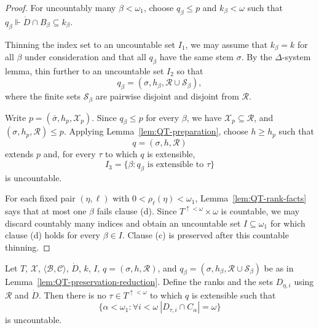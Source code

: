 \begin{proof}
For uncountably many $\beta<\omega_1$, choose $q_\beta\leq p$ and
$k_\beta<\omega$ such that $q_\beta\Vdash \dot D\cap B_\beta\subseteq k_\beta$.

Thinning the index set to an uncountable set $I_1$, we may assume that $k_\beta=k$ for all $\beta$ under
consideration and that all $q_\beta$ have the same stem $\sigma$.  By the
$\Delta$-system lemma, thin further to an uncountable set $I_2$ so that
\[
  q_\beta=(\sigma,h_\beta,\mathcal R\cup\mathcal S_\beta),
\]
where the finite sets $\mathcal S_\beta$ are pairwise disjoint and disjoint
from $\mathcal R$.

Write $p=(\bar\sigma,h_p,\mathcal X_p)$.  Since $q_\beta\leq p$ for every
$\beta$, we have $\mathcal X_p\subseteq\mathcal R$, and
$(\sigma,h_p,\mathcal R)\leq p$.  Applying
Lemma~\ref{lem:QT-preparation}, choose $h\geq h_p$ such that
\[
  q=(\sigma,h,\mathcal R)
\]
extends $p$ and, for every $\tau$ to which $q$ is extensible,
\[
  I_3=\{\beta:q_\beta\text{ is extensible to }\tau\}
\]
is uncountable.

For each fixed pair $(\eta,\ell)$ with $0<\rho_\ell(\eta)<\omega_1$,
Lemma~\ref{lem:QT-rank-facts} says that at most one $\beta$ fails clause (d).
Since $T^{\uparrow<\omega}\times\omega$ is countable, we may discard countably
many indices and obtain an uncountable set $I\subseteq\omega_1$ for which
clause (d) holds for every $\beta\in I$.  Clause (c) is preserved after this
countable thinning.
\end{proof}

\begin{lemma}\label{lem:QT-case-one-impossible}
Let $T$, $\mathcal X$, $\langle\mathcal B,\mathcal C\rangle$, $\dot D$,
$k$, $I$, $q=(\sigma,h,\mathcal R)$, and
$q_\beta=(\sigma,h_\beta,\mathcal R\cup\mathcal S_\beta)$ be as in
Lemma~\ref{lem:QT-preservation-reduction}.  Define the ranks and the sets
$D_{\eta,i}$ using $\mathcal R$ and $\dot D$.  Then there is no
$\tau\in T^{\uparrow<\omega}$ to which $q$ is extensible such that
\[
  \{\alpha<\omega_1:
    \forall i<\omega\ |D_{\tau,i}\cap C_\alpha|=\omega\}
\]
is uncountable.
\end{lemma}

